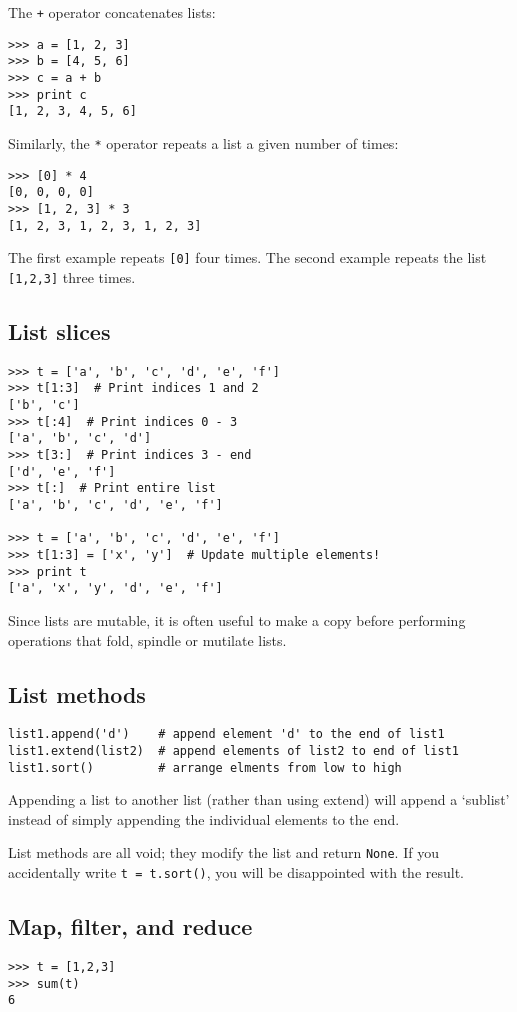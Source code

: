 \documentclass{article}
\begin{document}
The \verb|+| operator concatenates lists:
\begin{verbatim}
>>> a = [1, 2, 3]
>>> b = [4, 5, 6]
>>> c = a + b
>>> print c
[1, 2, 3, 4, 5, 6]
\end{verbatim}
\par Similarly, the \verb|*| operator repeats a list a given number of times:
\begin{verbatim}
>>> [0] * 4
[0, 0, 0, 0]
>>> [1, 2, 3] * 3
[1, 2, 3, 1, 2, 3, 1, 2, 3]
\end{verbatim}
\par The first example repeats \verb|[0]| four times. The second example
repeats the list \verb|[1,2,3]| three times.
\subsection{List slices}
\begin{lstlisting}
>>> t = ['a', 'b', 'c', 'd', 'e', 'f']
>>> t[1:3]  # Print indices 1 and 2
['b', 'c']
>>> t[:4]  # Print indices 0 - 3
['a', 'b', 'c', 'd']
>>> t[3:]  # Print indices 3 - end
['d', 'e', 'f']
>>> t[:]  # Print entire list
['a', 'b', 'c', 'd', 'e', 'f']

>>> t = ['a', 'b', 'c', 'd', 'e', 'f']
>>> t[1:3] = ['x', 'y']  # Update multiple elements!
>>> print t
['a', 'x', 'y', 'd', 'e', 'f']
\end{lstlisting}
Since lists are mutable, it is often useful to make a copy before performing
operations that fold, spindle or mutilate lists.

\subsection{List methods}
\begin{lstlisting}
list1.append('d')    # append element 'd' to the end of list1
list1.extend(list2)  # append elements of list2 to end of list1
list1.sort()         # arrange elments from low to high
\end{lstlisting}
Appending a list to another list (rather than using extend) will append
a `sublist' instead of simply appending the individual elements to the end.

List methods are all void; they modify the list and return \verb|None|. If you
accidentally write \verb|t = t.sort()|, you will be disappointed with the result.

\subsection{Map, filter, and reduce}
\begin{lstlisting}
>>> t = [1,2,3]
>>> sum(t)
6
\end{lstlisting}
\end{document}
